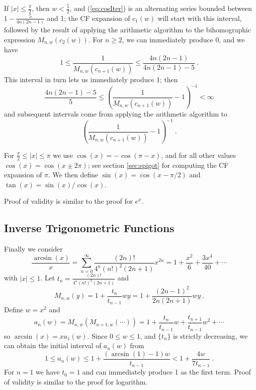\documentclass[11pt, oneside]{amsart}   	%
\renewcommand{\:}{\negthickspace:\negthickspace}
\begin{document}
If $|x| \leq \frac{\pi}{2}$, then $w < \frac{5}{2}$, and (\ref{eq:cosIter}) is an alternating series bounded between $1 - \frac{5}{4n(2n-1)}$ and 1; the CF expansion of $c_1(w)$ will start with this interval,  followed by the result of applying the arithmetic algorithm to the bihomographic expression $M_{n,w}(c_2(w))$. For $n \geq 2$, we can immediately produce 0, and we have
\[
1  \leq \frac{1}{M_{n,w}(c_{n+1}(w))} \leq \frac{4n(2n-1)}{4n(2n-1)-5} \ .
\]
This interval in turn lets us immediately produce 1; then
\[
 \frac{4n(2n-1)-5}{5} \leq \left(\frac{1}{M_{n,w}(c_{n+1}(w))} - 1 \right)^{-1} < \infty
\]
and subsequent intervals come from applying the arithmetic algorithm to
\[
\left(\frac{1}{M_{n,w}(c_{n+1}(w))} - 1\right) ^{-1} \ .
\]

For $\frac{\pi}{2} \leq |x| \leq \pi$ we use $\cos(x) = -\cos(\pi - x)$, and for all other values $\cos(x) = \cos(x \pm 2\pi)$; see section \ref{sec:spigot} for computing the CF expansion of $\pi$. We then define $\sin(x) = \cos(x-\pi/2)$ and $\tan(x)=\sin(x)/\cos(x)$.

Proof of validity is similar to the proof for $e^x$.


\subsection{Inverse Trigonometric Functions}
Finally we consider
\[
\frac{\arcsin(x)}{x} = \sum_{n=0}^{\infty} \frac{(2n)!}{4^n(n!)^2(2n+1)}x^{2n} = 1 + \frac{x^2}{6} + \frac{3x^4}{40} + \cdots
\]
with $| x | \leq 1$. Let $t_n = \frac{(2n)!}{4^n(n!)^2(2n+1)}$ and
\[
M_{n,w}(y) = 1 + \frac{t_n}{t_{n-1}}wy = 1 + \frac{(2n-1)^2}{2n(2n+1)}wy \ .
\]
Define $w=x^2$ and
\[
a_n(w) = M_{n,w}(M_{n+1,w}(\cdots)) = 1 + \frac{t_n}{t_{n-1}}w+ \frac{t_{n+1}}{t_{n-1}}w^2 + \cdots
\]
so $\arcsin(x) = x a_1(w)$. Since $0 \leq w \leq 1$, and $\{t_n\}$ is strictly decreasing, we can obtain the initial interval of $a_n(w)$ from
\[
1 \leq a_n(w) \leq 1 + \frac{(\arcsin(1)-1)w}{t_{n-1}} < 1 + \frac{4w}{7t_{n-1}} \ .
\]
For $n=1$ we have $t_0=1$ and can immediately produce 1 as the first term.
Proof of validity is similar to the proof for logarithm.
\end{document}
